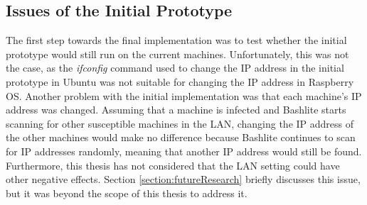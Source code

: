 \subsection{Issues of the Initial Prototype}
\label{section:IssuesOfInitialPrototype}
The first step towards the final implementation was to test whether the initial prototype would still run on the current machines. Unfortunately, this was not the case, as the \textit{ifconfig} command used to change the IP address in the initial prototype in Ubuntu was not suitable for changing the IP address in Raspberry OS. Another problem with the initial implementation was that each machine's IP address was changed. Assuming that a machine is infected and Bashlite starts scanning for other susceptible machines in the LAN, changing the IP address of the other machines would make no difference because Bashlite continues to scan for IP addresses randomly, meaning that another IP address would still be found. 
Furthermore, this thesis has not considered that the LAN setting could have other negative effects. Section \ref{section:futureResearch} briefly discusses this issue, but it was beyond the scope of this thesis to address it.   




